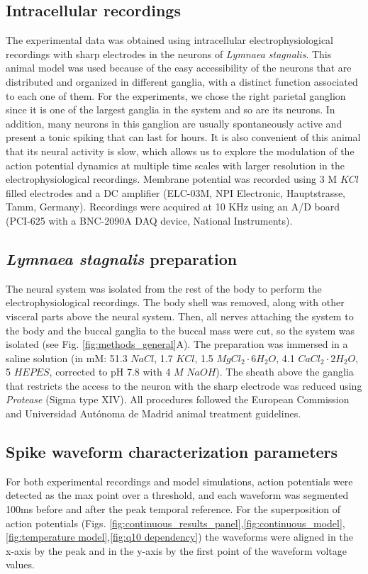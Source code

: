 
\subsection{Intracellular recordings}
\label{Lymnaea stagnalis preparation}
The experimental data was obtained using intracellular electrophysiological recordings with sharp electrodes in the neurons of \textit{Lymnaea stagnalis}. This animal model was used because of the easy accessibility of the neurons that are distributed and organized in different ganglia, with a distinct function associated to each one of them. For the experiments, we chose the right parietal ganglion since it is one of the largest ganglia in the system and so are its neurons. In addition, many neurons in this ganglion are usually spontaneously active and present a tonic spiking that can last for hours. It is also convenient of this animal that its neural activity is slow, which allows us to explore the modulation of the action potential dynamics at multiple time scales with larger resolution in the electrophysiological recordings. Membrane potential was recorded using 3 M $KCl$ filled electrodes and a DC amplifier (ELC-03M, NPI Electronic, Hauptstrasse, Tamm, Germany). Recordings were acquired at 10 KHz using an A/D board (PCI-625 with a BNC-2090A DAQ device, National Instruments). 

\subsection{\textit{Lymnaea stagnalis} preparation}

The neural system was isolated from the rest of the body to perform the electrophysiological recordings. The body shell was removed, along with other visceral parts above the neural system. Then, all nerves attaching the system to the body and the buccal ganglia to the buccal mass were cut, so the system was isolated (see Fig. \ref{fig:methods_general}A). The preparation was immersed in a saline solution (in mM: 51.3 $NaCl$, 1.7 $KCl$, 1.5 $MgCl_2\cdot6H_2O$, 4.1 $CaCl_2\cdot2H_2O$, 5 $HEPES$, corrected to pH 7.8 with 4 $M$ $NaOH$).
The sheath above the ganglia that restricts the access to the neuron with the sharp electrode was reduced using \textit{Protease} (Sigma type XIV). All procedures followed the European Commission and Universidad Autónoma de Madrid animal treatment guidelines.

\subsection{Spike waveform characterization parameters} \label{sec:characterization parameters}
\label{sect:metrics}
For both experimental recordings and model simulations, action potentials were detected as the max point over a threshold, and each waveform was segmented 100ms before and after the peak temporal reference. For the superposition of action potentials (Figs. \ref{fig:continuous_results_panel},\ref{fig:continuous_model},\ref{fig:temperature model},\ref{fig:q10 dependency}) the waveforms were aligned in the x-axis by the peak and in the y-axis by the first point of the waveform voltage values.

